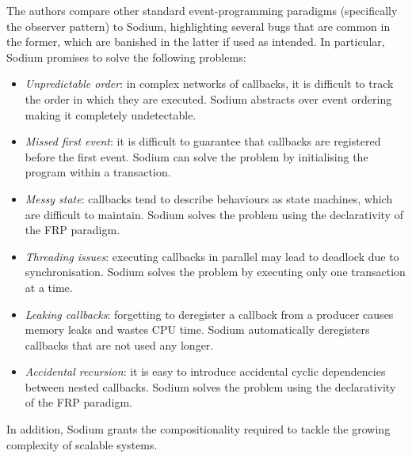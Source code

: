The authors compare other standard event-programming paradigms (specifically
the observer pattern) to Sodium, highlighting several bugs that are common in
the former, which are banished in the latter if used as intended. In
particular, Sodium promises to solve the following problems:
\begin{itemize}
  \item \textit{Unpredictable order}: in complex networks of callbacks, it is
        difficult to track the order in which they are executed. Sodium
        abstracts over event ordering making it completely undetectable.
  \item \textit{Missed first event}: it is difficult to guarantee that
        callbacks are registered before the first event. Sodium can solve the
        problem by initialising the program within a transaction.
  \item \textit{Messy state}: callbacks tend to describe behaviours as state
        machines, which are difficult to maintain. Sodium solves the problem
        using the declarativity of the \ac{FRP} paradigm.
  \item \textit{Threading issues}: executing callbacks in parallel may lead to
        deadlock due to synchronisation. Sodium solves the problem by executing
        only one transaction at a time.
  \item \textit{Leaking callbacks}: forgetting to deregister a callback from
        a producer causes memory leaks and wastes CPU time. Sodium
        automatically deregisters callbacks that are not used any longer.
  \item \textit{Accidental recursion}: it is easy to introduce accidental
        cyclic dependencies between nested callbacks. Sodium solves the problem
        using the declarativity of the \ac{FRP} paradigm.
\end{itemize}
In addition, Sodium grants the compositionality required to tackle the growing
complexity of scalable systems.
